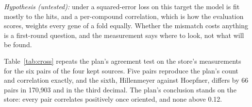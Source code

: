 
\textit{Hypothesis (untested):} under a squared-error loss on this target the model is fit
mostly to the hits, and a per-compound correlation, which is how the evaluation scores,
weights every gene of a fold equally. Whether the mismatch costs anything is a first-round
question, and the measurement says where to look, not what will be found.

Table~\ref{tab:cross} repeats the plan's agreement test on the store's measurements for
the six pairs of the four kept sources. Five pairs reproduce the plan's count and
correlation exactly, and the sixth, Hillenmeyer against Hoepfner, differs by 66 pairs in
170{,}903 and in the third decimal. The plan's conclusion stands on the store: every pair
correlates positively once oriented, and none above 0.12.

\begin{table}[htbp]
\centering
\footnotesize
\caption{Agreement between sources on the (gene, compound) pairs both measure, Spearman
as served and after orienting, beside the plan's values.}
\label{tab:cross}

\end{table}
